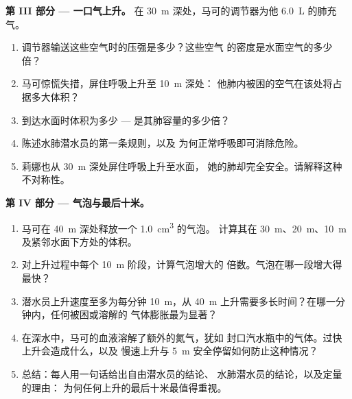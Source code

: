 \begin{problem}
\medskip
\noindent\textbf{第 III 部分 --- 一口气上升。}
在 \qty{30}{m} 深处，马可的调节器为他 \qty{6.0}{L} 的肺充气。
\begin{enumerate}[resume]
  \item 调节器输送这些空气时的压强是多少？这些空气
        的密度是水面空气的多少倍？
  \item 马可惊慌失措，屏住呼吸上升至 \qty{10}{m} 深处：
        他肺内被困的空气在该处将占据多大体积？
  \item 到达水面时体积为多少 --- 是其肺容量的多少倍？
  \item 陈述水肺潜水员的第一条规则，以及
        为何正常呼吸即可消除危险。
  \item 莉娜也从 \qty{30}{m} 深处屏住呼吸上升至水面，
        她的肺却完全安全。请解释这种不对称性。
\end{enumerate}

\medskip
\noindent\textbf{第 IV 部分 --- 气泡与最后十米。}
\begin{enumerate}[resume]
  \item 马可在 \qty{40}{m} 深处释放一个 \qty{1.0}{cm^3} 的气泡。
        计算其在 \qty{30}{m}、\qty{20}{m}、\qty{10}{m}
        及紧邻水面下方处的体积。
  \item 对上升过程中每个 \qty{10}{m} 阶段，计算气泡增大的
        倍数。气泡在哪一段增大得最快？
  \item 潜水员上升速度至多为每分钟 \qty{10}{m}，从
        \qty{40}{m} 上升需要多长时间？在哪一分钟内，任何被困或溶解的
        气体膨胀最为显著？
  \item 在深水中，马可的血液溶解了额外的氮气，犹如
        封口汽水瓶中的气体。过快上升会造成什么，以及
        慢速上升与 \qty{5}{m} 安全停留如何防止这种情况？
  \item 总结：每人用一句话给出自由潜水员的结论、
        水肺潜水员的结论，以及定量的理由：
        为何任何上升的最后十米最值得重视。
\end{enumerate}
\end{problem}

